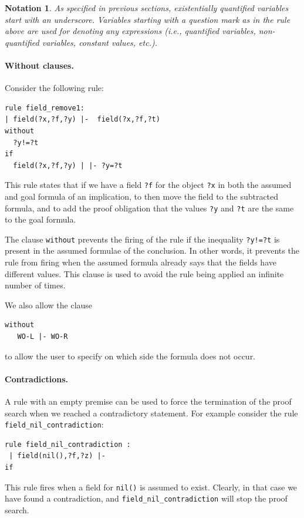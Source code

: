 \documentclass[11pt]{article}
\newtheorem{notation}{Notation}
\begin{document}
\begin{notation}
 As specified in previous sections, existentially quantified variables
start with an underscore. Variables starting with a question mark as in the rule above are used for 
denoting any expressions (i.e., quantified variables, non-quantified variables, constant values, etc.). 
\end{notation}

\paragraph{Without clauses.}
Consider the following rule:
\begin{verbatim}
rule field_remove1:
| field(?x,?f,?y) |-  field(?x,?f,?t) 
without
  ?y!=?t 
if
  field(?x,?f,?y) | |- ?y=?t 
\end{verbatim}
This rule states that
if we have a field {\tt ?f} for the object {\tt ?x} in both the assumed and goal formula of an implication, to then move the 
 field to the subtracted formula, and to add the proof obligation that the values {\tt ?y} and {\tt ?t} are the same to the goal formula. 

The clause {\tt without} prevents the firing of the rule if the inequality {\tt ?y!=?t} is
present in the assumed formulae of the conclusion. In other words, it prevents the rule from firing when the assumed formula already says
that the fields have different values.  This clause is used to avoid the rule being applied
an infinite number of times.

We also allow the clause 
\begin{verbatim}
without  
   WO-L |- WO-R
\end{verbatim}
to allow the user to specify on which side the formula does not occur.

\paragraph{Contradictions.} 
A rule with an empty premise can be used to force the termination of the proof
search when we reached a contradictory statement.
%
For example consider the rule {\tt field\_nil\_contradiction}: 
\begin{verbatim}
rule field_nil_contradiction :
 | field(nil(),?f,?z) |-
if
\end{verbatim}
This rule fires when a field for {\tt nil()} is assumed to exist. Clearly, in that case
 we have found a contradiction, and {\tt field\_nil\_contradiction}  will stop the proof search.
\end{document}
